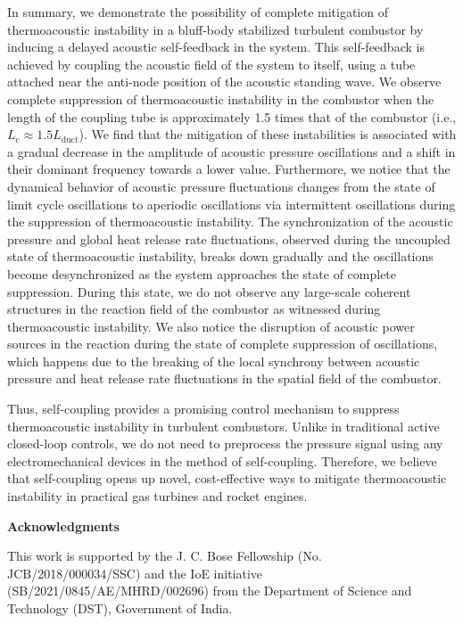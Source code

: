 \documentclass[twocolumn,10pt]{article} %
\newcommand{\acknowledgement}%
              [1]%
              {%
               \bgroup%
               \flushleft%
               \small\bf%
               #1%
               \par%
               \egroup%
              }%
\begin{document}
In summary, we demonstrate the possibility of complete mitigation of thermoacoustic instability in a bluff-body stabilized turbulent combustor by inducing a delayed acoustic self-feedback in the system. This self-feedback is achieved by coupling the acoustic field of the system to itself, using a tube attached near the anti-node position of the acoustic standing wave. We observe complete suppression of thermoacoustic instability in the combustor when the length of the coupling tube is approximately 1.5 times that of the combustor (i.e., $L_{\text{c}} \approx 1.5L_{\text{duct}}$). We find that the mitigation of these instabilities is associated with a gradual decrease in the amplitude of acoustic pressure oscillations and a shift in their dominant frequency towards a lower value. Furthermore, we notice that the dynamical behavior of acoustic pressure fluctuations changes from the state of limit cycle oscillations to aperiodic oscillations via intermittent oscillations during the suppression of thermoacoustic instability. The synchronization of the acoustic pressure and global heat release rate fluctuations, observed during the uncoupled state of thermoacoustic instability, breaks down gradually and the oscillations become desynchronized as the system approaches the state of complete suppression. During this state, we do not observe any large-scale coherent structures in the reaction field of the combustor as witnessed during thermoacoustic instability. We also notice the disruption of acoustic power sources in the reaction during the state of complete suppression of oscillations, which happens due to the breaking of the local synchrony between acoustic pressure and heat release rate fluctuations in the spatial field of the combustor. 

Thus, self-coupling provides a promising control mechanism to suppress thermoacoustic instability in turbulent combustors. Unlike in traditional active closed-loop controls, we do not need to preprocess the pressure signal using any electromechanical devices in the method of self-coupling. Therefore, we believe that self-coupling opens up novel, cost-effective ways to mitigate thermoacoustic instability in practical gas turbines and rocket engines. 
 
\acknowledgement{Acknowledgments} \addvspace{10pt}
This work is supported by the J. C. Bose Fellowship (No. JCB/2018/000034/SSC) and the IoE initiative (SB/2021/0845/AE/MHRD/002696) from the Department of Science and Technology (DST), Government of India.



\end{document}
